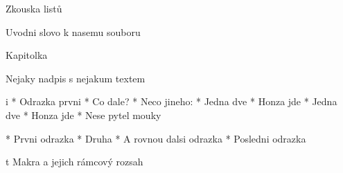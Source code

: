 
\chyph                    
\fontfam[Schola]

\tit Zkouska listů

Uvodni slovo k nasemu souboru

Kapitolka

 Nejaky nadpis s nejakum textem

\begitems \style i
* Odrazka prvni
* Co dale?
* Neco jineho:
\begitems
\begitems
* Jedna dve
* Honza jde
\enditems
* Jedna dve
* Honza jde
\enditems
* Nese pytel mouky
\enditems

\begitems
* Prvni odrazka
* Druha * A rovnou dalsi odrazka
* Posledni odrazka
\enditems

\bigskip
\center{}
\nobreak\medskip
\caption/t Makra a jejich rámcový rozsah
\bigskip

\bye
